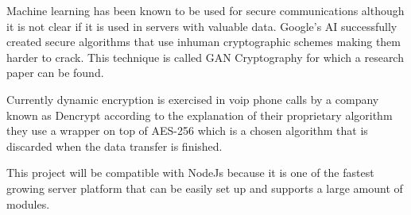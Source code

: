 %
%
%
%






%
%
%
%
Machine learning has been known to be used for secure communications although it is not clear if it is used in servers with valuable data. Google's AI successfully created secure algorithms \cite{GoogleAi1} that use inhuman cryptographic schemes making them harder to crack. This technique is called GAN Cryptography \cite{GoogleAi2} for which a research paper can be found.

Currently dynamic encryption is exercised in voip phone calls by a company known as Dencrypt \cite{dencrypt} according to the explanation of their proprietary algorithm they use a wrapper on top of AES-256 which is a chosen algorithm that is discarded when the data transfer is finished.


This project will be compatible with NodeJs because it is one of the fastest growing server platform \cite{NodeJs} that can be easily set up and supports a large amount of modules.

%
%
%
%

%
%
%
%




